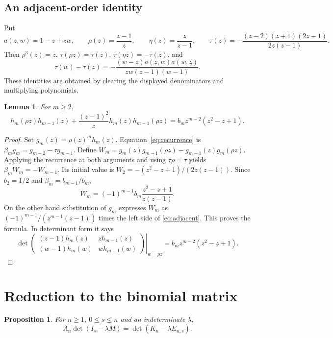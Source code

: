 \documentclass[11pt,a4paper]{amsart}
\newtheorem{lemma}[theorem]{Lemma}
\newtheorem{proposition}[theorem]{Proposition}
\theoremstyle{remark}\newtheorem{remark}[theorem]{Remark}
\numberwithin{equation}{section}
\begin{document}
\subsection{An adjacent-order identity}
Put
\[
 a(z,w)=1-z+zw,\qquad \rho(z)=\frac{z-1}{z},\qquad
 \eta(z)=\frac z{z-1},\qquad
 \tau(z)=-\frac{(z-2)(z+1)(2z-1)}{2z(z-1)}.
\]
Then $\rho^3(z)=z$, $\tau(\rho z)=\tau(z)$, $\tau(\eta z)=-\tau(z)$, and
\begin{equation}\label{eq:tau-diff}
 \tau(w)-\tau(z)=-\frac{(w-z)a(z,w)a(w,z)}{zw(z-1)(w-1)}.
\end{equation}
These identities are obtained by clearing the displayed denominators and multiplying polynomials.
\begin{lemma}\label{lem:adjacent}
For $m\ge2$,
\begin{equation}\label{eq:adjacent}
 h_m(\rho z)h_{m-1}(z)+\frac{(z-1)^2}{z}h_m(z)h_{m-1}(\rho z)
 =b_m z^{m-2}(z^2-z+1).
\end{equation}
\end{lemma}
\begin{proof}
Set $g_m(z)=\rho(z)^m h_m(z)$. Equation~\eqref{eq:recurrence} is
$\beta_mg_m=g_{m-2}-\tau g_{m-1}$. Define
$W_m=g_m(z)g_{m-1}(\rho z)-g_{m-1}(z)g_m(\rho z)$.
Applying the recurrence at both arguments and using $\tau\rho=\tau$ yields
$\beta_m W_m=-W_{m-1}$. Its initial value is
$W_2=-(z^2-z+1)/(2z(z-1))$. Since $b_2=1/2$ and $\beta_m=b_{m-1}/b_m$,
\[
 W_m=(-1)^{m-1}b_m\frac{z^2-z+1}{z(z-1)}.
\]
On the other hand substitution of $g_m$ expresses $W_m$ as $(-1)^{m-1}/(z^{m-1}(z-1))$ times the left side of \eqref{eq:adjacent}. This proves the formula. In determinant form it says
\begin{equation}\label{eq:adj-det}
 \left.\det\begin{pmatrix}(z-1)h_m(z)&zh_{m-1}(z)\\
 (w-1)h_m(w)&wh_{m-1}(w)\end{pmatrix}\right|_{w=\rho z}
 =b_mz^{m-2}(z^2-z+1).
\end{equation}
\end{proof}

\section{Reduction to the binomial matrix}\label{sec:candidate}
\begin{proposition}\label{prop:candidate}
For $n\ge1$, $0\le s\le n$ and an indeterminate $\lambda$,
\begin{equation}\label{eq:candidate}
 A_n\det(I_s-\lambda M)=\det(K_n-\lambda E_{n,s}).
\end{equation}
\end{proposition}
\end{document}
